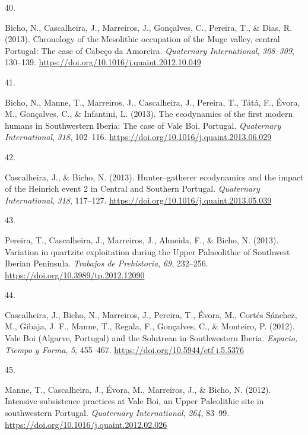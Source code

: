 \documentclass[11pt,a4paper,]{awesome-cv}
\newlength{\cslhangindent}
\newlength{\csllabelwidth}
\newenvironment{CSLReferences}[2] %
 {\begin{list}{}{%
  \setlength{\itemindent}{0pt}
  \setlength{\leftmargin}{0pt}
  \setlength{\parsep}{0pt}
  \ifodd #1
   \setlength{\leftmargin}{\cslhangindent}
   \setlength{\itemindent}{-1\cslhangindent}
  \fi
  \setlength{\itemsep}{#2\baselineskip}}}
 {\end{list}}
\newcommand{\CSLLeftMargin}[1]{\parbox[t]{\csllabelwidth}{\strut#1\strut}}
\newcommand{\CSLRightInline}[1]{\parbox[t]{\linewidth - \csllabelwidth}{\strut#1\strut}}
\begin{document}
\begin{CSLReferences}{0}{0}
\CSLLeftMargin{40. }%
\CSLRightInline{Bicho, N., Cascalheira, J., Marreiros, J., Gonçalves,
C., Pereira, T., \& Dias, R. (2013). Chronology of the Mesolithic
occupation of the Muge valley, central Portugal: The case of Cabeço da
Amoreira. \emph{Quaternary International}, \emph{308--309}, 130--139.
\url{https://doi.org/10.1016/j.quaint.2012.10.049}}

\CSLLeftMargin{41. }%
\CSLRightInline{Bicho, N., Manne, T., Marreiros, J., Cascalheira, J.,
Pereira, T., Tátá, F., Évora, M., Gonçalves, C., \& Infantini, L.
(2013). The ecodynamics of the first modern humans in Southwestern
Iberia: The case of Vale Boi, Portugal. \emph{Quaternary International},
\emph{318}, 102--116.
\url{https://doi.org/10.1016/j.quaint.2013.06.029}}

\CSLLeftMargin{42. }%
\CSLRightInline{Cascalheira, J., \& Bicho, N. (2013). Hunter--gatherer
ecodynamics and the impact of the Heinrich event 2 in Central and
Southern Portugal. \emph{Quaternary International}, \emph{318},
117--127. \url{https://doi.org/10.1016/j.quaint.2013.05.039}}

\CSLLeftMargin{43. }%
\CSLRightInline{Pereira, T., Cascalheira, J., Marreiros, J., Almeida,
F., \& Bicho, N. (2013). Variation in quartzite exploitation during the
Upper Palaeolithic of Southwest Iberian Peninsula. \emph{Trabajos de
Prehistoria}, \emph{69}, 232--256.
\url{https://doi.org/10.3989/tp.2012.12090}}

\CSLLeftMargin{44. }%
\CSLRightInline{Cascalheira, J., Bicho, N., Marreiros, J., Pereira, T.,
Évora, M., Cortés Sánchez, M., Gibaja, J. F., Manne, T., Regala, F.,
Gonçalves, C., \& Monteiro, P. (2012). Vale Boi (Algarve, Portugal) and
the Solutrean in Southwestern Iberia. \emph{Espacio, Tiempo y Forma},
\emph{5}, 455--467.
\href{https://doi.org/10.5944/etf\%20i.5.5376}{https://doi.org/10.5944/etf
i.5.5376}}

\CSLLeftMargin{45. }%
\CSLRightInline{Manne, T., Cascalheira, J., Évora, M., Marreiros, J., \&
Bicho, N. (2012). Intensive subsistence practices at Vale Boi, an Upper
Paleolithic site in southwestern Portugal. \emph{Quaternary
International}, \emph{264}, 83--99.
\url{https://doi.org/10.1016/j.quaint.2012.02.026}}

\end{CSLReferences}
\end{document}
